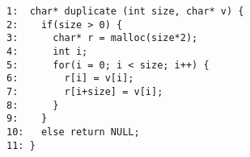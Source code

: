 \documentclass[preview]{standalone}
\begin{document}
\lstset{language=C,  
        numbers=left,
        stepnumber=1,    
        firstnumber=1,
        numberfirstline=true
       } 
  \begin{lstlisting}
1:  char* duplicate (int size, char* v) {
2:    if(size > 0) {
3:      char* r = malloc(size*2);
4:      int i;
5:      for(i = 0; i < size; i++) {
6:        r[i] = v[i];
7:        r[i+size] = v[i];
8:      }
9:    }
10:   else return NULL;
11: }
  \end{lstlisting}
\end{document}
